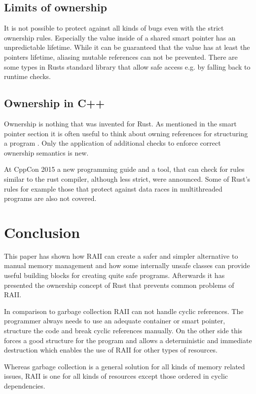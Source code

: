 \documentclass[conference,twocolumn]{IEEEtran}
\begin{document}
\subsection{Limits of ownership}
It is not possible to protect against all kinds of bugs even with the strict ownership rules. Especially the value inside of a shared smart pointer has an unpredictable lifetime. While it can be guaranteed that the value has at least the pointers lifetime, aliasing mutable references can not be prevented. There are some types in Rusts standard library that allow safe access e.g. by falling back to runtime checks.


\subsection{Ownership in C++}
Ownership is nothing that was invented for Rust. As mentioned in the smart pointer section it is often useful to think about owning references for structuring a program \cite{meyers2014effective}. Only the application of additional checks to enforce correct ownership semantics is new.

At CppCon 2015 a new programming guide and a tool, that can check for rules similar to the rust compiler, although less strict, were announced. Some of Rust's rules for example those that protect against data races in multithreaded programs are also not covered. \cite{cppCheckHSutter}


\section{Conclusion}

This paper has shown how RAII can create a safer and simpler alternative to manual memory management and how some internally unsafe classes can provide useful building blocks for creating quite safe programs. Afterwards it has presented the ownership concept of Rust that prevents common problems of RAII.

In comparison to garbage collection RAII can not handle cyclic references. The programmer always needs to use an adequate container or smart pointer, structure the code and break cyclic references manually. On the other side this forces a good structure for the program and allows a deterministic and immediate destruction which enables the use of RAII for other types of resources. 

Whereas garbage collection is a general solution for all kinds of memory related issues, RAII is one for all kinds of resources except those ordered in cyclic dependencies.
\end{document}
